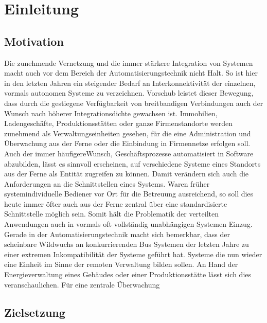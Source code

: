 \chapter{Einleitung}

\thispagestyle{standard}
\pagestyle{standard}
\section{Motivation}

Die zunehmende Vernetzung und die immer stärkere Integration von Systemen macht
auch vor dem Bereich der Automatisierungstechnik nicht Halt. So ist hier in den letzten
Jahren ein steigender Bedarf an Interkonnektivität der einzelnen, vormals autonomen
Systeme zu verzeichnen. Vorschub leistet dieser Bewegung, dass durch die gestiegene
Verfügbarkeit von breitbandigen Verbindungen auch der Wunsch nach höherer Integrationsdichte
gewachsen ist. Immobilien, Ladengeschäfte, Produktionsstätten oder ganze
Firmenstandorte werden zunehmend als Verwaltungseinheiten gesehen, für die eine Administration
und Überwachung aus der Ferne oder die Einbindung in Firmennetze erfolgen
soll.
Auch der immer häufigereWunsch, Geschäftsprozesse automatisiert in Software abzubilden,
lässt es sinnvoll erscheinen, auf verschiedene Systeme eines Standorts aus der Ferne
als Entität zugreifen zu können. Damit verändern sich auch die Anforderungen an die
Schnittstellen eines Systems. Waren früher systemindividuelle Bediener vor Ort für die
Betreuung ausreichend, so soll dies heute immer öfter auch aus der Ferne zentral über
eine standardisierte Schnittstelle möglich sein. Somit hält die Problematik der verteilten
Anwendungen auch in vormals oft vollständig unabhängigen Systemen Einzug.
Gerade in der Automatisierungstechnik macht sich bemerkbar, dass der scheinbare Wildwuchs
an konkurrierenden Bus Systemen der letzten Jahre zu einer extremen Inkompatibilität
der Systeme geführt hat. Systeme die nun wieder eine Einheit im Sinne der remoten
Verwaltung bilden sollen. An Hand der Energieverwaltung eines Gebäudes oder
einer Produktionsstätte lässt sich dies veranschaulichen. Für eine zentrale Überwachung



\section{Zielsetzung}

